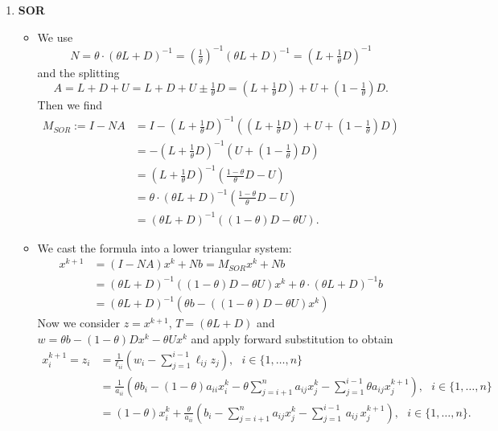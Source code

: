 {\begin{enumerate}
\begin{itemize}
\begin{align*}
	x^{k+1}_i = z_i &=\frac{1}{\ell_{ii}}\left(w_i-\sum_{j=1}^{i-1}\ell_{ij}z_j\right),~~~i\in\{1,\ldots,n\} \\
	&=\frac{1}{a_{ii}}\left(b_i - \sum_{j=i+1}^{n}a_{ij}x^{k}_j-\sum_{j=1}^{i-1}a_{ij}x^{k+1}_j\right),~~~i\in\{1,\ldots,n\}.
	\end{align*}
	\end{itemize}
	\item \textbf{SOR}
	\begin{itemize}
		 \item We use 
		 $$N=\theta\cdot(\theta L+D)^{-1} 
		 =\left(\tfrac{1}{\theta}\right)^{-1}( \theta L+ D) ^{-1} 
		 =\left(   L+ \tfrac{1}{\theta}D\right)^{-1}$$ 
		 and the splitting
		 $$A=L+D+U =L+D+U\pm \tfrac{1}{\theta}D 
		 =  (L+ \tfrac{1}{\theta}D) + U + (1-\tfrac{1}{\theta})D.$$ 
		 Then we find
	    \begin{align*}
	    M_{SOR} := I-NA &=  I - \left(   L+ \tfrac{1}{\theta}D\right)^{-1} \left( (L+ \tfrac{1}{\theta}D) + U + (1-\tfrac{1}{\theta})D\right)\\
	    &= - \left(   L+ \tfrac{1}{\theta}D\right)^{-1} \left(U + (1-\tfrac{1}{\theta})D\right)\\
	    &=\left(   L+ \tfrac{1}{\theta}D\right)^{-1} \left( \tfrac{1-\theta}{\theta}D - U\right)\\
	    &=\theta\cdot(\theta L+D)^{-1}  \left( \tfrac{1-\theta}{\theta}D - U\right) \\
	    &= (\theta L+D)^{-1}  \left( (1-\theta)D - \theta U\right) .
	    \end{align*} 
	    \item We cast the formula into a lower triangular system:
	    \begin{align*}
	    x^{k+1} &=  (I-NA)x^k + Nb   =M_{SOR}x^k + Nb\\
	    & = (\theta L+D)^{-1}  \left( (1-\theta)D - \theta U\right) x^k + \theta\cdot(\theta L+D)^{-1} b\\
	    & = (\theta L+D)^{-1}(\theta b-((1-\theta)D - \theta U) x^k)
	    \end{align*}
   		Now we consider $z= x^{k+1}$, $T=(\theta L+D)$ and $w = \theta b- (1-\theta)Dx^k - \theta U  x^k$ and apply forward substitution to obtain
	    \begin{align*}
	    x^{k+1}_i = z_i &=\frac{1}{\ell_{ii}}\left(w_i-\sum_{j=1}^{i-1}\ell_{ij}z_j\right),~~~i\in\{1,\ldots,n\} \\
	    &=\frac{1}{a_{ii}}\left(\theta b_i - (1-\theta)a_{ii}x_i^k - \theta \sum_{j=i+1}^{n}a_{ij}x^{k}_j-\sum_{j=1}^{i-1}\theta a_{ij}x^{k+1}_j\right),~~~i\in\{1,\ldots,n\}\\
	    	    &=(1-\theta)x_i^k+   \frac{\theta}{a_{ii}}\left( b_i-  \sum\limits^n_{j = i+1} a_{ij}x^k_j  - \sum\limits^{i-1}_{j=1} \,a_{ij} \, x_j^{k+1}  \right),~~~i\in\{1,\ldots,n\}.
	    \end{align*}
	\end{itemize}
\end{enumerate}

}
